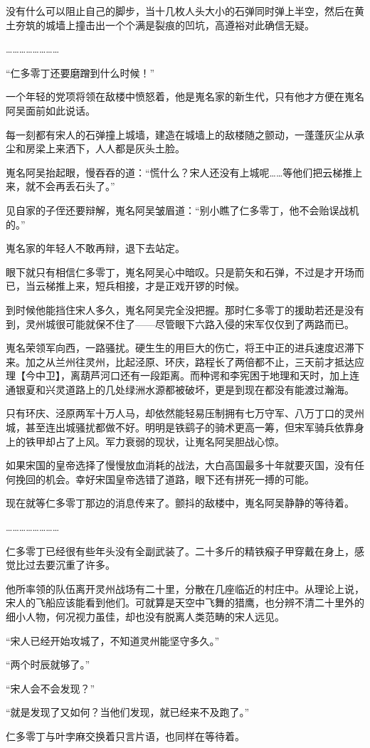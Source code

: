 没有什么可以阻止自己的脚步，当十几枚人头大小的石弹同时弹上半空，然后在黄土夯筑的城墙上撞击出一个个满是裂痕的凹坑，高遵裕对此确信无疑。

……………………

“仁多零丁还要磨蹭到什么时候！”

一个年轻的党项将领在敌楼中愤怒着，他是嵬名家的新生代，只有他才方便在嵬名阿吴面前如此说话。

每一刻都有宋人的石弹撞上城墙，建造在城墙上的敌楼随之颤动，一蓬蓬灰尘从承尘和房梁上来洒下，人人都是灰头土脸。

嵬名阿吴抬起眼，慢吞吞的道：“慌什么？宋人还没有上城呢……等他们把云梯推上来，就不会再丢石头了。”

见自家的子侄还要辩解，嵬名阿吴皱眉道：“别小瞧了仁多零丁，他不会贻误战机的。”

嵬名家的年轻人不敢再辩，退下去站定。

眼下就只有相信仁多零丁，嵬名阿吴心中暗叹。只是箭矢和石弹，不过是才开场而已，当云梯推上来，短兵相接，才是正戏开锣的时候。

到时候他能挡住宋人多久，嵬名阿吴完全没把握。那时仁多零丁的援助若还是没有到，灵州城很可能就保不住了——尽管眼下六路入侵的宋军仅仅到了两路而已。

嵬名荣领军向西，一路骚扰。硬生生的用巨大的伤亡，将王中正的进兵速度迟滞下来。加之从兰州往灵州，比起泾原、环庆，路程长了两倍都不止，三天前才抵达应理【今中卫】，离葫芦河口还有一段距离。而种谔和李宪困于地理和天时，加上连通银夏和兴灵道路上的几处绿洲水源都被破坏，更是到现在都没有能渡过瀚海。

只有环庆、泾原两军十万人马，却依然能轻易压制拥有七万守军、八万丁口的灵州城，甚至连出城骚扰都做不好。明明是铁鹞子的骑术更高一筹，但宋军骑兵依靠身上的铁甲却占了上风。军力衰弱的现状，让嵬名阿吴胆战心惊。

如果宋国的皇帝选择了慢慢放血消耗的战法，大白高国最多十年就要灭国，没有任何挽回的机会。幸好宋国皇帝选错了道路，眼下还有拼死一搏的可能。

现在就等仁多零丁那边的消息传来了。颤抖的敌楼中，嵬名阿吴静静的等待着。

……………………

仁多零丁已经很有些年头没有全副武装了。二十多斤的精铁瘊子甲穿戴在身上，感觉比过去要沉重了许多。

他所率领的队伍离开灵州战场有二十里，分散在几座临近的村庄中。从理论上说，宋人的飞船应该能看到他们。可就算是天空中飞舞的猎鹰，也分辨不清二十里外的细小人物，何况视力虽佳，却也没有脱离人类范畴的宋人远见。

“宋人已经开始攻城了，不知道灵州能坚守多久。”

“两个时辰就够了。”

“宋人会不会发现？”

“就是发现了又如何？当他们发现，就已经来不及跑了。”

仁多零丁与叶孛麻交换着只言片语，也同样在等待着。

